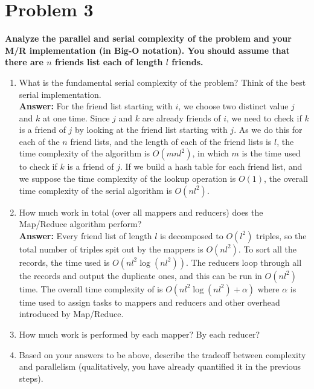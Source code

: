 \documentclass[letterpaper, 11pt]{article}
\begin{document}
\section*{Problem 3}
\textbf{Analyze the parallel and serial complexity of the problem and your M/R implementation (in Big-O notation). You should assume that there are $n$ friends list each of length $l$ friends.}
\begin{enumerate}
    \item What is the fundamental serial complexity of the problem? Think of the best serial implementation.\\
    \textbf{Answer:} For the friend list starting with $i$, we choose two distinct value $j$ and $k$ at one time. Since $j$ and $k$ are already friends of $i$, we need to check if $k$ is a friend of $j$ by looking at the friend list starting with $j$. As we do this for each of the $n$ friend lists, and the length of each of the friend lists is $l$, the time complexity of the algorithm is $O(mnl^2)$, in which $m$ is the time used to check if $k$ is a friend of $j$. If we build a hash table
    for each friend list, and we suppose the time complexity of the lookup operation is $O(1)$, the overall time complexity of the serial algorithm is $O(nl^2)$.
    \item How much work in total (over all mappers and reducers) does the Map/Reduce algorithm perform?\\
    \textbf{Answer:} Every friend list of length $l$ is decomposed to $O(l^2)$ triples, so the total number of triples spit out by the mappers is $O(nl^2)$. To sort all the records, the time used is $O(nl^2\log(nl^2))$. The reducers loop through all the records and output the duplicate ones, and this can be run in $O(nl^2)$ time. The overall time complexity of is $O(nl^2\log(nl^2)+\alpha)$ where $\alpha$ is time used to assign tasks to mappers and reducers and other overhead introduced
    by Map/Reduce.

    \item How much work is performed by each mapper? By each reducer?
    \item Based on your answers to be above, describe the tradeoff between complexity and parallelism (qualitatively, you have already quantified it in the previous steps).
\end{enumerate}
\end{document}
